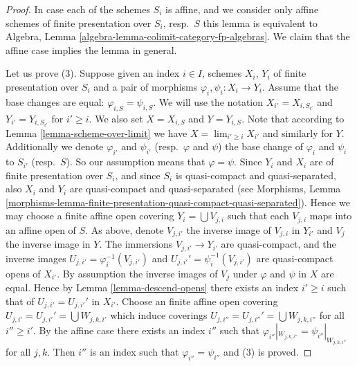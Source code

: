 \begin{proof}
In case each of the schemes $S_i$ is affine, and we consider
only affine schemes of finite presentation over $S_i$, resp.\ $S$
this lemma is equivalent to
Algebra, Lemma \ref{algebra-lemma-colimit-category-fp-algebras}.
We claim that the affine case implies the lemma in general.

\medskip\noindent
Let us prove (3). Suppose given an index $i \in I$, schemes
$X_i$, $Y_i$ of finite presentation over $S_i$ and a pair of morphisms
$\varphi_i, \psi_i : X_i \to Y_i$. Assume that the base changes are
equal: $\varphi_{i, S} = \psi_{i, S}$. We will use the notation
$X_{i'} = X_{i, S_{i'}}$ and $Y_{i'} = Y_{i, S_{i'}}$ for
$i' \geq i$. We also set $X = X_{i, S}$ and $Y = Y_{i, S}$.
Note that according to Lemma \ref{lemma-scheme-over-limit} we have
$X = \lim_{i' \geq i} X_{i'}$ and similarly for $Y$.
Additionally we denote $\varphi_{i'}$ and $\psi_{i'}$
(resp.\ $\varphi$ and $\psi$)
the base change of $\varphi_i$ and $\psi_i$ to $S_{i'}$
(resp.\ $S$). So our assumption means that $\varphi = \psi$.
Since $Y_i$ and $X_i$ are of finite presentation
over $S_i$, and since $S_i$ is quasi-compact and quasi-separated, also
$X_i$ and $Y_i$ are quasi-compact and quasi-separated
(see Morphisms,
Lemma \ref{morphisms-lemma-finite-presentation-quasi-compact-quasi-separated}).
Hence we may choose a finite affine open covering
$Y_i = \bigcup V_{j, i}$ such that each $V_{j, i}$ maps into
an affine open of $S$. As above, denote $V_{j, i'}$ the inverse
image of $V_{j, i}$ in $Y_{i'}$ and $V_j$ the inverse image in $Y$.
The immersions $V_{j, i'} \to Y_{i'}$ are quasi-compact, and the inverse images
$U_{j, i'} = \varphi_i^{-1}(V_{j, i'})$ and
$U_{j, i'}' = \psi_i^{-1}(V_{j, i'})$
are quasi-compact opens of $X_{i'}$. By assumption the inverse images of
$V_j$ under $\varphi$ and $\psi$ in $X$ are equal.
Hence by Lemma \ref{lemma-descend-opens}
there exists an index $i' \geq i$ such that
of $U_{j, i'} = U_{j, i'}'$ in $X_{i'}$.
Choose an finite affine open covering
$U_{j, i'} = U_{j, i'}' = \bigcup W_{j, k, i'}$
which induce coverings $U_{j, i''} = U_{j, i''}' = \bigcup W_{j, k, i''}$
for all $i'' \geq i'$.
By the affine case there exists
an index $i''$ such that
$\varphi_{i''}|_{W_{j, k, i''}} = \psi_{i''}|_{W_{j, k, i''}}$
for all $j, k$. Then $i''$ is an index such that
$\varphi_{i''} = \psi_{i''}$ and (3) is proved.


\end{proof}
